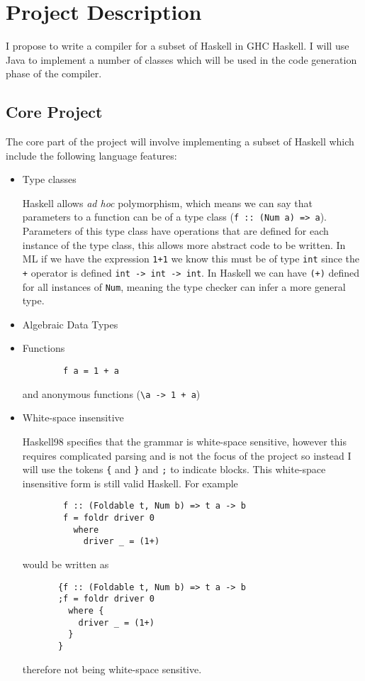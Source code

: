 \documentclass[a4paper,12pt]{article}
\begin{document}
\section*{Project Description}
  I propose to write a compiler for a subset of Haskell in GHC Haskell. I will use Java to implement a number of classes which will be used in the 
  code generation phase of the compiler.

  \subsection*{Core Project}

  The core part of the project will involve implementing a subset of Haskell which include the following language features:
  \begin{itemize}
    \item Type classes
      
      Haskell allows \textit{ad hoc} polymorphism, which means we can say that parameters to a function can be of a type class (\texttt{f :: (Num a) => a}).
      Parameters of this type class have operations that are defined for each instance of the type class, this allows more abstract code to be written.
      In ML if we have the expression \texttt{1+1} we know this must be of type \texttt{int} since the \texttt{+} operator is defined \texttt{int -> int -> int}.
      In Haskell we can have \texttt{(+)} defined for all instances of \texttt{Num}, meaning the type checker can infer a more general type.

    \item Algebraic Data Types 

    \item Functions 
      \begin{verbatim}
        f a = 1 + a
      \end{verbatim}
      and anonymous functions (\texttt{\textbackslash a -> 1 + a})

    \item White-space insensitive

      Haskell98 specifies that the grammar is white-space sensitive, however this requires complicated parsing and is not the focus of the project so instead I will
      use the tokens \texttt{\{} and \texttt{\}} and \texttt{;} to indicate blocks. This white-space insensitive form is still valid Haskell.
      For example 
      \begin{verbatim}
        f :: (Foldable t, Num b) => t a -> b
        f = foldr driver 0
          where
            driver _ = (1+)
      \end{verbatim} 
      would be written as
      \begin{verbatim}
       {f :: (Foldable t, Num b) => t a -> b
       ;f = foldr driver 0
         where {
           driver _ = (1+)
         }
       }
      \end{verbatim}
      therefore not being white-space sensitive.


\end{itemize}
\end{document}
